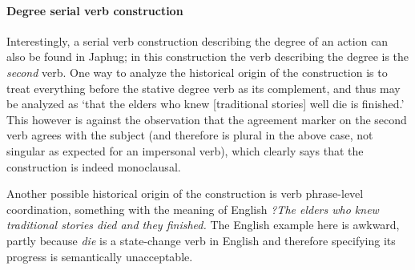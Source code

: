 \documentclass[a4paper, oneside, 12pt]{report}
\newcommand*{\citepage}[1]{p.~{#1}}
\newcommand{\form}[1]{\emph{#1}}
\newcommand{\translate}[1]{`#1'}
\begin{document}
\paragraph*{Degree serial verb construction} 

Interestingly, a serial verb construction describing the degree of an action 
can also be found in Japhug; 
in this construction the verb describing the degree is the \emph{second} verb.
One way to analyze the historical origin of the construction 
is to treat everything before the stative degree verb as its complement,
and thus \citet[\citepage{1410}, (76)]{jacques2021grammar} 
may be analyzed as \translate{that the elders who knew [traditional stories] well die is finished.}
This however is against the observation that the agreement marker on the second verb 
agrees with the subject (and therefore is plural in the above case, 
not singular as expected for an impersonal verb),
which clearly says that the construction is indeed monoclausal.

Another possible historical origin of the construction 
is verb phrase-level coordination,  
something with the meaning of 
English \form{?The elders who knew traditional stories died and they finished.}
The English example here is awkward, 
partly because \form{die} is a state-change verb in English 
and therefore specifying its progress is semantically unacceptable.




\end{document}
